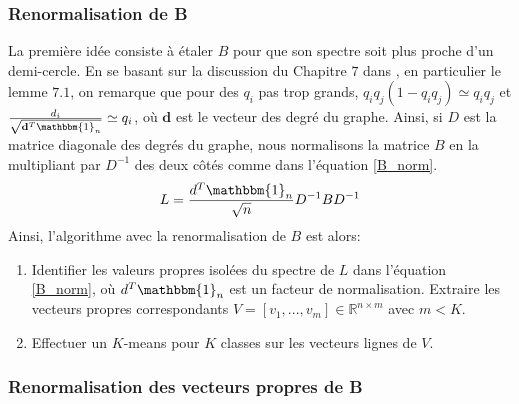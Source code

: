 \documentclass[../../main.tex]{subfiles} %
\begin{document}
\subsubsection{Renormalisation de B}
La première idée consiste à étaler $B$ pour que son spectre soit plus proche
d'un demi-cercle. En se basant sur la discussion du Chapitre $7$ dans 
\cite{romain_couillet}, en particulier le lemme $7.1$, on remarque que pour des
$q_i$ pas trop grands, $q_i q_j (1- q_i q_j) \simeq q_i q_j$ et
$\frac{d_i}{\sqrt{\mathbf{d}^T \mathbbm{1}_n}} \simeq q_i$, où $\mathbf{d}$ est
le vecteur des degré du graphe. Ainsi, si $D$ est la matrice diagonale des
degrés du graphe, nous normalisons la matrice $B$ en la multipliant par $D^{-1}$
des deux côtés comme dans l'équation \ref{B_norm}.
\begin{equation}
	L = \frac{d^T \mathbbm{1}_n}{\sqrt{n}} D^{-1} B D^{-1}
	\label{B_norm}
\end{equation}
Ainsi, l'algorithme avec la renormalisation de $B$ est alors:
\begin{enumerate}
    \item Identifier les valeurs propres isolées du spectre de $L$ dans 
	    l'équation \ref{B_norm}, où $d^T \mathbbm{1}_n$ est un facteur de
	    normalisation. Extraire les vecteurs propres correspondants
	    $V = [v_1, ..., v_m] \in \mathbb{R}^{n \times m}$ avec $m < K$. 
    \item Effectuer un $K$-means pour $K$ classes sur les vecteurs lignes de $V$.
\end{enumerate}

\subsubsection{Renormalisation des vecteurs propres de B}
\end{document}
